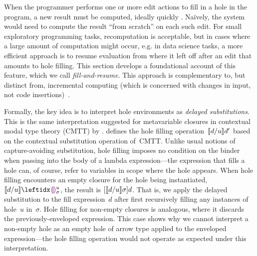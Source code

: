 When the programmer performs one or more edit actions to fill in a hole in the program, a new result must be computed, ideally quickly \cite{DBLP:conf/icse/Tanimoto13,DBLP:journals/vlc/Tanimoto90}. Na\"ively, the system would need to compute the result ``from scratch'' on each such edit. For small exploratory programming tasks, recomputation is acceptable, but in cases where a large amount of computation might occur, e.g. in data science tasks, a more efficient approach is to resume evaluation from where it left off after an edit that amounts to hole filling. This section develops a foundational account of this feature, which we call \emph{fill-and-resume}. This approach is complementary to, but distinct from, incremental computing (which is concerned with changes in input, not code insertions)~\cite{Hammer2014}.

Formally,
%
the key idea is to interpret hole environments as \emph{delayed substitutions}. This is the same interpretation suggested for metavariable closures in contextual modal
type theory (CMTT) by \citet{Nanevski2008}.
%
%
 defines the hole filling operation~$\llbracket d / u\rrbracket d'$
based on the contextual substitution operation of~CMTT.
%
Unlike usual notions of capture-avoiding substitution,
hole filling imposes no condition on the binder when passing into the
body of a lambda expression---the expression that fills a hole can, of
course, refer to variables in scope where the hole appears.
%
When hole filling encounters an empty closure for the hole being
instantiated, $\instantiate{d}{u}{\dehole{u}{\sigma}{}}$, the result
is $[\llbracket d / u\rrbracket \sigma]d$.
%
That is, we apply the delayed substitution to the fill expression~$d$
after first recursively filling any instances of hole~$u$ in~$\sigma$.
%
Hole filling for non-empty closures is analogous, where it discards
the previously-enveloped expression.
%
%
%
This case shows why we cannot interpret a non-empty hole as an empty
hole of arrow type applied to the enveloped expression---the hole
filling operation would not operate as expected under this
interpretation.


